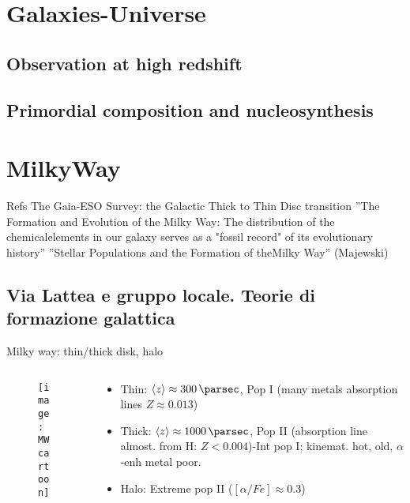 \section{Galaxies-Universe}

\subsection{Observation at high redshift}

\subsection{Primordial composition and nucleosynthesis}


\section{MilkyWay}

\begin{frame}{Refs}
The Gaia-ESO Survey: the Galactic Thick to Thin Disc transition
''The Formation and Evolution of the Milky Way: The distribution of the chemicalelements in our galaxy serves as a "fossil record" of its evolutionary history''
''Stellar Populations and the Formation of theMilky Way'' (Majewski)
\end{frame}

\subsection{Via Lattea e gruppo locale. Teorie di formazione galattica}

\begin{frame}{Milky way: thin/thick disk, halo}
\begin{columns}[T]
\begin{column}{0.5\textwidth}
\begin{figure}[!ht]\texttt{[image: MWcartoon]}\label{fig:MWcartoon}\end{figure}
\end{column}
\begin{column}{0.5\textwidth}
\begin{itemize}
\item Thin: $\exv{z}\approx\SI{300}{\parsec}$, Pop I (many metals absorption lines $Z\approx0.013$)
\item Thick: $\exv{z}\approx\SI{1000}{\parsec}$, Pop II (absorption line almost. from H: $Z<0.004$)-Int pop I; kinemat. hot, old, $\alpha$-enh metal poor.
\item Halo: Extreme pop II ($[\alpha/Fe]\approx0.3$)
\end{itemize}
\end{column}
\end{columns}
\end{frame}


